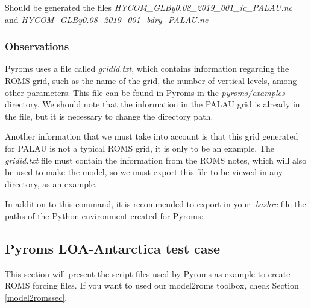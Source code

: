 Should be generated the files \textit{HYCOM\_GLBy0.08\_2019\_001\_ic\_PALAU.nc} and \textit{HYCOM\_GLBy0.08\_2019\_001\_bdry\_PALAU.nc}
\bigskip

\subsubsection{Observations}
\bigskip

Pyroms uses a file called \textit{gridid.txt}, which contains information regarding the ROMS grid, such as the name of the grid, the number of 
vertical levels, among other parameters. This file can be found in Pyroms in the \textit{pyroms/examples} directory. We should note that the information in 
the PALAU grid is already in the file, but it is necessary to change the directory path.
\bigskip

Another information that we must take into account is that this grid generated for PALAU is not a typical ROMS grid, it is only to be 
an example. The \textit{gridid.txt} file must contain the information from the ROMS notes, which will also be used to make the model, so we must 
export this file to be viewed in any directory, as an example.
\bigskip

In addition to this command, it is recommended to export in your \textit{.bashrc} file the paths of the Python environment created for Pyroms: 
\bigskip

\bigskip

\subsection{Pyroms LOA-Antarctica test case}\label{loatest}
\bigskip

\begin{tcolorbox}[enhanced,
    grow to left by   = 0cm,
    grow to right by  = 0cm,
    enlarge top by    = 0cm,
    enlarge bottom by = 0cm,
    tcbox raise base,
    boxrule           = 1.0pt,
    left              = 18mm,
    colframe          = red!50!black,coltext=red!25!black,colback=red!10!white,
    overlay           = {\begin{tcbclipinterior}\fill[red!75!blue!50!white] (frame.south west)
      rectangle node[text=white,font=\sffamily\bfseries\footnotesize,rotate=0] {WARNING} ([xshift=18mm]frame.north west);\end{tcbclipinterior}}]
This section will present the script files used by Pyroms as example to create ROMS forcing files. If you want to used our model2roms toolbox, check Section \textcolor{bleu_cite}{\ref{model2romssec}}.
  \end{tcolorbox}
\bigskip

